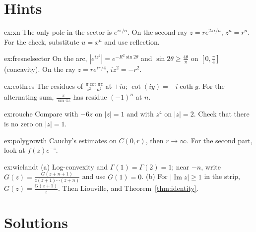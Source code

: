 \section{Hints}

\begin{hint}{ex:xn}
The only pole in the sector is $e^{i\pi/n}$. On the second ray $z=re^{2\pi i/n}$, $z^n=r^n$. For the check, substitute $u=x^n$ and use reflection.
\end{hint}
\begin{hint}{ex:fresnelsector}
On the arc, $|e^{iz^2}|=e^{-R^2\sin2\theta}$ and $\sin2\theta\ge\frac{4\theta}\pi$ on $[0,\frac\pi4]$ (concavity). On the ray $z=re^{i\pi/4}$, $iz^2=-r^2$.
\end{hint}
\begin{hint}{ex:cothres}
The residues of $\frac{\pi\cot\pi z}{z^2+a^2}$ at $\pm ia$; $\cot(iy)=-i\coth y$. For the alternating sum, $\frac\pi{\sin\pi z}$ has residue $(-1)^n$ at $n$.
\end{hint}
\begin{hint}{ex:rouche}
Compare with $-6z$ on $|z|=1$ and with $z^4$ on $|z|=2$. Check that there is no zero on $|z|=1$.
\end{hint}
\begin{hint}{ex:polygrowth}
Cauchy's estimates on $C(0,r)$, then $r\to\infty$. For the second part, look at $f(z)e^{-z}$.
\end{hint}
\begin{hint}{ex:wielandt}
(a) Log-convexity and $\Gamma(1)=\Gamma(2)=1$; near $-n$, write $G(z)=\frac{G(z+n+1)}{z(z+1)\cdots(z+n)}$ and use $G(1)=0$. (b) For $|\operatorname{Im}z|\ge1$ in the strip, $G(z)=\frac{G(z+1)}z$.
Then Liouville, and Theorem~\ref{thm:identity}.
\end{hint}

\section{Solutions}

